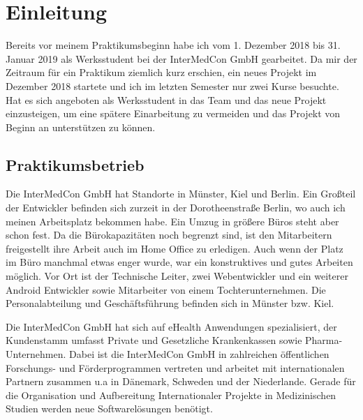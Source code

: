 \chapter{Einleitung}\label{einleitung}
Bereits vor meinem Praktikumsbeginn habe ich vom 1. Dezember 2018 bis 31. Januar 2019 als Werksstudent bei der InterMedCon GmbH gearbeitet. Da mir der Zeitraum für ein Praktikum ziemlich kurz erschien, ein neues Projekt im Dezember 2018 startete und ich im letzten Semester nur zwei Kurse besuchte. Hat es sich angeboten als Werksstudent in das Team und das neue Projekt einzusteigen, um eine spätere Einarbeitung zu vermeiden und das Projekt von Beginn an unterstützen zu können. 
\section{Praktikumsbetrieb}
Die InterMedCon GmbH hat Standorte in Münster, Kiel und Berlin. Ein Großteil der Entwickler befinden sich zurzeit in der Dorotheenstraße Berlin, wo auch ich meinen Arbeitsplatz bekommen habe. Ein Umzug in größere Büros steht aber schon fest. Da die Bürokapazitäten noch begrenzt sind, ist den Mitarbeitern freigestellt ihre Arbeit auch im Home Office zu erledigen. Auch wenn der Platz im Büro manchmal etwas enger wurde, war ein konstruktives und gutes Arbeiten möglich. Vor Ort ist der Technische Leiter, zwei Webentwickler und ein weiterer Android Entwickler sowie Mitarbeiter von einem Tochterunternehmen. Die Personalabteilung und Geschäftsführung befinden sich in Münster bzw. Kiel. 

Die InterMedCon GmbH hat sich auf eHealth Anwendungen spezialisiert, der Kundenstamm umfasst Private und Gesetzliche Krankenkassen sowie Pharma-Unternehmen. Dabei ist die InterMedCon GmbH in zahlreichen öffentlichen Forschungs- und Förderprogrammen vertreten und arbeitet mit internationalen Partnern zusammen u.a in Dänemark, Schweden und der Niederlande. Gerade für die Organisation und Aufbereitung Internationaler Projekte in Medizinischen Studien werden neue Softwarelösungen benötigt. 




